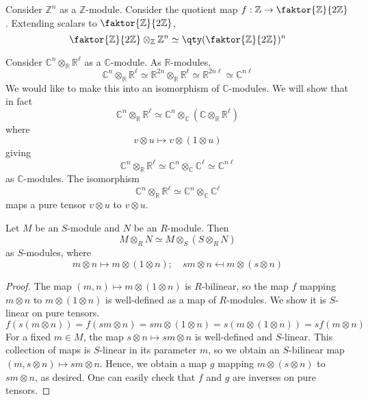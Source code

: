 \begin{example}
    Consider \( \mathbb Z^n \) as a \( \mathbb Z \)-module.
    Consider the quotient map \( f : \mathbb Z \to \faktor{\mathbb Z}{2\mathbb Z} \).
    Extending scalars to \( \faktor{\mathbb Z}{2\mathbb Z} \),
    \[ \faktor{\mathbb Z}{2\mathbb Z} \otimes_{\mathbb Z} \mathbb Z^n \simeq \qty(\faktor{\mathbb Z}{2\mathbb Z})^n \]
\end{example}
\begin{example}
    Consider \( \mathbb C^n \otimes_{\mathbb R} \mathbb R^\ell \) as a \( \mathbb C \)-module.
    As \( \mathbb R \)-modules,
    \[ \mathbb C^n \otimes_{\mathbb R} \mathbb R^\ell \simeq \mathbb R^{2n} \otimes_{\mathbb R} \mathbb R^\ell \simeq \mathbb R^{2n\ell} \simeq \mathbb C^{n\ell} \]
    We would like to make this into an isomorphism of \( \mathbb C \)-modules.
    We will show that in fact
    \[ \mathbb C^n \otimes_{\mathbb R} \mathbb R^\ell \simeq \mathbb C^n \otimes_{\mathbb C} (\mathbb C \otimes_{\mathbb R} \mathbb R^\ell) \]
    where
    \[ v \otimes u \mapsto v \otimes (1 \otimes u) \]
    giving
    \[ \mathbb C^n \otimes_{\mathbb R} \mathbb R^\ell \simeq \mathbb C^n \otimes_{\mathbb C} \mathbb C^\ell \simeq \mathbb C^{n\ell} \]
    as \( \mathbb C \)-modules.
    The isomorphism
    \[ \mathbb C^n \otimes_{\mathbb R} \mathbb R^\ell \simeq \mathbb C^n \otimes_{\mathbb C} \mathbb C^\ell \]
    maps a pure tensor \( v \otimes u \) to \( v \otimes u \).
\end{example}
\begin{proposition}
    Let \( M \) be an \( S \)-module and \( N \) be an \( R \)-module.
    Then
    \[ M \otimes_R N \simeq M \otimes_S (S \otimes_R N) \]
    as \( S \)-modules, where
    \[ m \otimes n \mapsto m \otimes (1 \otimes n);\quad sm \otimes n \mapsfrom m \otimes (s \otimes n) \]
\end{proposition}
\begin{proof}
    The map \( (m, n) \mapsto m \otimes (1 \otimes n) \) is \( R \)-bilinear, so the map \( f \) mapping \( m \otimes n \) to \( m \otimes (1 \otimes n) \) is well-defined as a map of \( R \)-modules.
    We show it is \( S \)-linear on pure tensors.
    \[ f(s(m \otimes n)) = f(sm \otimes n) = sm \otimes (1 \otimes n) = s (m \otimes (1 \otimes n)) = s f(m \otimes n) \]
    For a fixed \( m \in M \), the map \( s \otimes n \mapsto sm \otimes n \) is well-defined and \( S \)-linear.
    This collection of maps is \( S \)-linear in its parameter \( m \), so we obtain an \( S \)-bilinear map \( (m, s \otimes n) \mapsto sm \otimes n \).
    Hence, we obtain a map \( g \) mapping \( m \otimes (s \otimes n) \) to \( sm \otimes n \), as desired.
    One can easily check that \( f \) and \( g \) are inverses on pure tensors.
\end{proof}
